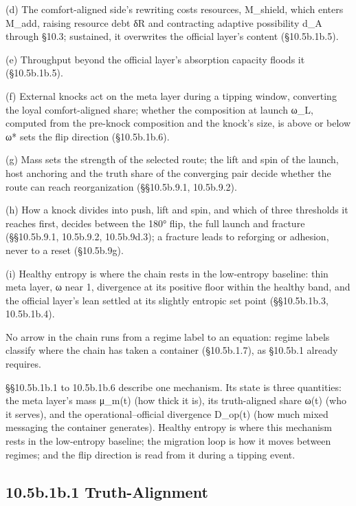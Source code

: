 \documentclass[
]{article}
\begin{document}
(d) The comfort-aligned side's rewriting costs resources, M\_shield,
which enters M\_add, raising resource debt δR and contracting adaptive
possibility d\_A through §10.3; sustained, it overwrites the official
layer's content (§10.5b.1b.5).

(e) Throughput beyond the official layer's absorption capacity floods it
(§10.5b.1b.5).

(f) External knocks act on the meta layer during a tipping window,
converting the loyal comfort-aligned share; whether the composition at
launch ω\_L, computed from the pre-knock composition and the knock's
size, is above or below ω* sets the flip direction (§10.5b.1b.6).

(g) Mass sets the strength of the selected route; the lift and spin of
the launch, host anchoring and the truth share of the converging pair
decide whether the route can reach reorganization (§§10.5b.9.1,
10.5b.9.2).

(h) How a knock divides into push, lift and spin, and which of three
thresholds it reaches first, decides between the 180° flip, the full
launch and fracture (§§10.5b.9.1, 10.5b.9.2, 10.5b.9d.3); a fracture
leads to reforging or adhesion, never to a reset (§10.5b.9g).

(i) Healthy entropy is where the chain rests in the low-entropy
baseline: thin meta layer, ω near 1, divergence at its positive floor
within the healthy band, and the official layer's lean settled at its
slightly entropic set point (§§10.5b.1b.3, 10.5b.1b.4).

No arrow in the chain runs from a regime label to an equation: regime
labels classify where the chain has taken a container (§10.5b.1.7), as
§10.5b.1 already requires.

§§10.5b.1b.1 to 10.5b.1b.6 describe one mechanism. Its state is three
quantities: the meta layer's mass μ\_m(t) (how thick it is), its
truth-aligned share ω(t) (who it serves), and the operational--official
divergence D\_op(t) (how much mixed messaging the container generates).
Healthy entropy is where this mechanism rests in the low-entropy
baseline; the migration loop is how it moves between regimes; and the
flip direction is read from it during a tipping event.

\hypertarget{b.1b.1-truth-alignment}{%
\subsection{10.5b.1b.1 Truth-Alignment}\label{b.1b.1-truth-alignment}}
\end{document}
